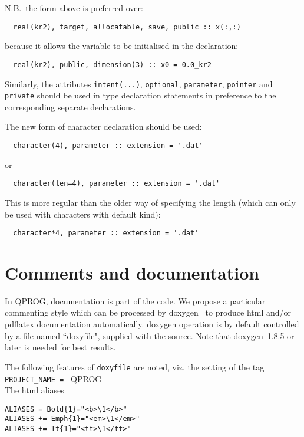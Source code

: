\documentclass[11pt,twoside,a4paper]{report}
\newcommand{\T}[1]{{\tt #1}}
\def\coden{QPROG} %
\begin{document}
N.B.\ the form above is preferred over:
\begin{verbatim}
  real(kr2), target, allocatable, save, public :: x(:,:)
\end{verbatim}
because it allows the variable to be initialised in the declaration:
\begin{verbatim}
  real(kr2), public, dimension(3) :: x0 = 0.0_kr2
\end{verbatim}

Similarly, the attributes \verb|intent(...)|, \verb|optional|,
\verb|parameter|, \verb|pointer| and \verb|private| should be used in
type declaration statements in preference to the corresponding
separate declarations.

The new form of character declaration should be used:
\begin{verbatim}
  character(4), parameter :: extension = '.dat'
\end{verbatim}
or
\begin{verbatim}
  character(len=4), parameter :: extension = '.dat'
\end{verbatim}

This is more regular than the older way of specifying the length
(which can only be used with characters with default kind):
\begin{verbatim}
  character*4, parameter :: extension = '.dat'
\end{verbatim}

\section{Comments and documentation}

In \coden, documentation is part of the code. We
propose a particular commenting style which can be processed by
doxygen~\cite{He07doxy} to produce html and/or pdflatex documentation automatically.
doxygen operation is by default controlled by a file named ``doxyfile",
supplied with the source. Note that doxygen~1.8.5  or later is needed
for best results.

The following features of \T{doxyfile} are noted, viz.
the setting of the tag\\
\verb|PROJECT_NAME = | \coden\  \\
The html aliases
\begin{verbatim}
ALIASES = Bold{1}="<b>\1</b>"
ALIASES += Emph{1}="<em>\1</em>"
ALIASES += Tt{1}="<tt>\1</tt>"
\end{verbatim}
\end{document}
